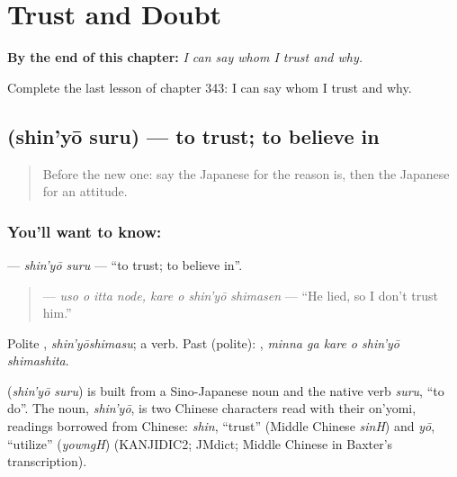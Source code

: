 
\chapter{Trust and Doubt}
\label{ch:ja-trust-and-doubt}

\begin{chapteropening}
\textbf{By the end of this chapter:} \emph{I can say whom I trust and why.}

Complete the last lesson of chapter 343: I can say whom I trust and why.
\end{chapteropening}

\section[\texorpdfstring{\ja{しんようする} (shin'yō suru)}{しんようする (shin'yō suru)}]{ (shin'yō suru) — to trust; to believe in}

\label{lesson:JA-C343-shin-you-suru}



\begin{quote}
Before the new one: say the Japanese for the reason is, then the Japanese for an attitude.
\end{quote}

\subsection*{You'll want to know: }
\textbf{} — \emph{shin'yō suru} — \textquotedblleft{}to trust; to believe in\textquotedblright{}.

\begin{quote}
\textbf{  } — \emph{uso o itta node, kare o shin'yō shimasen} — \textquotedblleft{}He lied, so I don't trust him.\textquotedblright{}
\end{quote}

Polite \textbf{}, \emph{shin'yōshimasu}; a  verb. Past (polite): \textbf{  }, \emph{minna ga kare o shin'yō shimashita}.

\begin{cousinweb}
\textbf{} (\emph{shin'yō suru}) is built from a Sino-Japanese noun and the native verb \emph{suru}, \textquotedblleft{}to do\textquotedblright{}. The noun, \emph{shin'yō}, is two Chinese characters read with their on'yomi, readings borrowed from Chinese: \emph{shin}, \textquotedblleft{}trust\textquotedblright{} (Middle Chinese \emph{sinH}) and \emph{yō}, \textquotedblleft{}utilize\textquotedblright{} (\emph{yowngH}) (KANJIDIC2; JMdict; Middle Chinese in Baxter's transcription).
\end{cousinweb}

